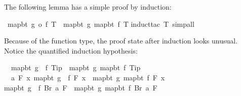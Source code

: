 \begin{isabellebody}
\begin{isamarkuptext}
The following lemma has a simple proof by induction:%
\end{isamarkuptext}%
\isamarkuptrue%
\ {\isachardoublequote}map{\isacharunderscore}bt\ {\isacharparenleft}g\ o\ f{\isacharparenright}\ T\ {\isacharequal}\ map{\isacharunderscore}bt\ g\ {\isacharparenleft}map{\isacharunderscore}bt\ f\ T{\isacharparenright}{\isachardoublequote}\isanewline
\isamarkupfalse%
induct{\isacharunderscore}tac\ T{\isacharcomma}\ simp{\isacharunderscore}all{\isacharparenright}\isanewline
\isamarkupfalse%
\isanewline
\isamarkupfalse%
\isamarkupfalse%
\isamarkupfalse%
%
\begin{isamarkuptxt}%
\noindent
Because of the function type, the proof state after induction looks unusual.
Notice the quantified induction hypothesis:
\begin{isabelle}%
\ {}{\isachardot}\ map{\isacharunderscore}bt\ {\isacharparenleft}g\ {\isasymcirc}\ f{\isacharparenright}\ Tip\ {\isacharequal}\ map{\isacharunderscore}bt\ g\ {\isacharparenleft}map{\isacharunderscore}bt\ f\ Tip{\isacharparenright}\isanewline
\ {}{\isachardot}\ {\isasymAnd}a\ F{\isachardot}\ {\isacharparenleft}{\isasymAnd}x{\isachardot}\ map{\isacharunderscore}bt\ {\isacharparenleft}g\ {\isasymcirc}\ f{\isacharparenright}\ {\isacharparenleft}F\ x{\isacharparenright}\ {\isacharequal}\ map{\isacharunderscore}bt\ g\ {\isacharparenleft}map{\isacharunderscore}bt\ f\ {\isacharparenleft}F\ x{\isacharparenright}{\isacharparenright}{\isacharparenright}\ {\isasymLongrightarrow}\isanewline
{}map{\isacharunderscore}bt\ {\isacharparenleft}g\ {\isasymcirc}\ f{\isacharparenright}\ {\isacharparenleft}Br\ a\ F{\isacharparenright}\ {\isacharequal}\ map{\isacharunderscore}bt\ g\ {\isacharparenleft}map{\isacharunderscore}bt\ f\ {\isacharparenleft}Br\ a\ F{\isacharparenright}{\isacharparenright}%
\end{isabelle}%
\end{isamarkuptxt}%
\isamarkuptrue%
\isamarkupfalse%
\isamarkupfalse%
\end{isabellebody}%
